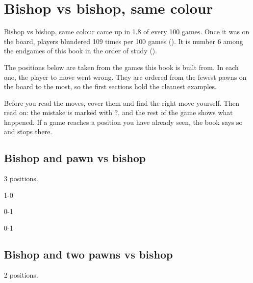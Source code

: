 \chapter{Bishop vs bishop, same colour}\label{ch:bishop-vs-bishop-same-colour}
Bishop vs bishop, same colour came up in 1.8 of every 100 games. Once it was on the board, players blundered 109 times per 100 games (). It is number 6 among the endgames of this book in the order of study ().

The positions below are taken from the games this book is built from. In each one, the player to move went wrong. They are ordered from the fewest pawns on the board to the most, so the first sections hold the cleanest examples.

Before you read the moves, cover them and find the right move yourself. Then read on: the mistake is marked with ?, and the rest of the game shows what happened. If a game reaches a position you have already seen, the book says so and stops there.


\section{Bishop and pawn vs bishop}
3 positions.


1-0\par
{}

0-1\par
{}

0-1\par
\section{Bishop and two pawns vs bishop}
2 positions.

